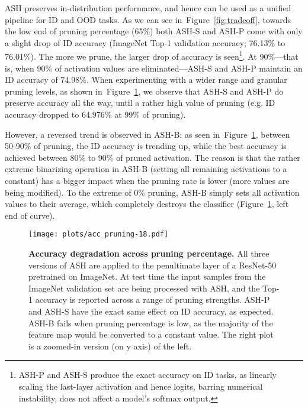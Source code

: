 \documentclass{article}
\newcommand{\figlabel}[1]{\label{fig:#1}}
\newcommand{\figref}[1]{Figure~\ref{fig:#1}}
\begin{document}
ASH preserves in-distribution performance, and hence can be used as a unified pipeline for ID and OOD tasks.
As we can see in~\figref{tradeoff}, towards the low end of pruning percentage (65\%) both ASH-S and ASH-P come with only a slight drop of ID accuracy (ImageNet Top-1 validation accuracy; 76.13\% to 76.01\%). The more we prune, the larger drop of accuracy is seen\footnote{ASH-P and ASH-S produce the exact accuracy on ID tasks, as linearly scaling the last-layer activation and hence logits, barring numerical instability, does not affect a model's softmax output.}. At 90\%---that is, when 90\% of activation values are eliminated---ASH-S and ASH-P maintain an ID accuracy of 74.98\%. 
When experimenting with a wider range and granular pruning levels, as shown in~\figref{accdeg}, we observe that ASH-S and ASH-P do preserve accuracy all the way, until a rather high value of pruning (e.g. ID accuracy dropped to 64.976\% at 99\% of pruning).

However, a reversed trend is observed in ASH-B: as seen in~\figref{accdeg}, between 50-90\% of pruning, the ID accuracy is trending up, while the best accuracy is achieved between 80\% to 90\% of pruned activation. 
The reason is that the rather extreme binarizing operation in ASH-B (setting all remaining activations to a constant) has a bigger impact when the pruning rate is lower (more values are being modified). To the extreme of 0\% pruning, ASH-B simply sets all activation values to their average, which completely destroys the classifier (\figref{accdeg}, left end of curve).



\begin{figure}[hbt!]
    \centering 
	\texttt{[image: plots/acc\_pruning-18.pdf]}
	
	\caption{\textbf{Accuracy degradation across pruning percentage.} All three versions of ASH are applied to the penultimate layer of a ResNet-50 pretrained on ImageNet. At test time the input samples from the ImageNet validation set are being processed with ASH, and the Top-1 accuracy is reported across a range of pruning strengths. ASH-P and ASH-S have the exact same effect on ID accuracy, as expected. ASH-B fails when pruning percentage is low, as the majority of the feature map would be converted to a constant value. The right plot is a zoomed-in version (on y axis) of the left.}
	\figlabel{accdeg}
\end{figure}
\end{document}
